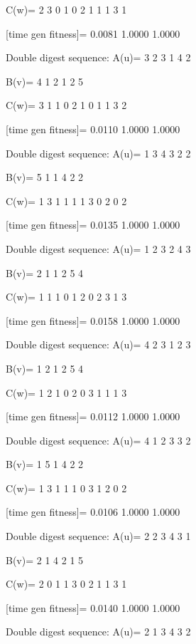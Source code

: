 C(w)=
     2     3     0     1     0     2     1     1     1     3     1

[time gen fitness]=
    0.0081    1.0000    1.0000

Double digest sequence:
A(u)=
     3     2     3     1     4     2

B(v)=
     4     1     2     1     2     5

C(w)=
     3     1     1     0     2     1     0     1     1     3     2

[time gen fitness]=
    0.0110    1.0000    1.0000

Double digest sequence:
A(u)=
     1     3     4     3     2     2

B(v)=
     5     1     1     4     2     2

C(w)=
     1     3     1     1     1     1     3     0     2     0     2

[time gen fitness]=
    0.0135    1.0000    1.0000

Double digest sequence:
A(u)=
     1     2     3     2     4     3

B(v)=
     2     1     1     2     5     4

C(w)=
     1     1     1     0     1     2     0     2     3     1     3

[time gen fitness]=
    0.0158    1.0000    1.0000

Double digest sequence:
A(u)=
     4     2     3     1     2     3

B(v)=
     1     2     1     2     5     4

C(w)=
     1     2     1     0     2     0     3     1     1     1     3

[time gen fitness]=
    0.0112    1.0000    1.0000

Double digest sequence:
A(u)=
     4     1     2     3     3     2

B(v)=
     1     5     1     4     2     2

C(w)=
     1     3     1     1     1     0     3     1     2     0     2

[time gen fitness]=
    0.0106    1.0000    1.0000

Double digest sequence:
A(u)=
     2     2     3     4     3     1

B(v)=
     2     1     4     2     1     5

C(w)=
     2     0     1     1     3     0     2     1     1     3     1

[time gen fitness]=
    0.0140    1.0000    1.0000

Double digest sequence:
A(u)=
     2     1     3     4     3     2

